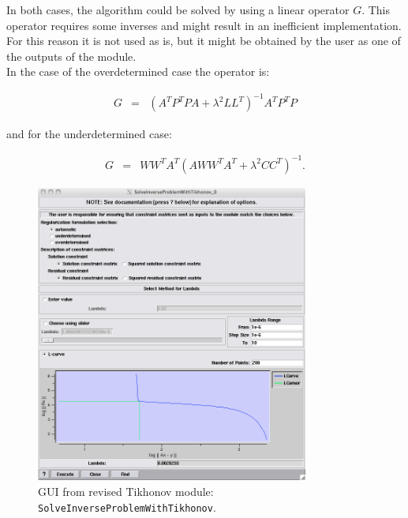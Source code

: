 \noindent In both cases, the algorithm could be solved by using a linear operator $G$. This operator requires some inverses and might result in an inefficient implementation. 
For this reason it is not used as is, but it might be obtained by the user as one of the outputs of the module.\\
In the case of the overdetermined case the operator is:
\begin{center}
\begin{eqnarray}
   G &=& (A^{T} P^{T} P A + \lambda^{2} L L^{T})^{-1} A^{T} P^{T} P
\label{tik_problem_overdet_invop}
\end{eqnarray}
\end{center}
\noindent and for the underdetermined case:
\begin{center}
\begin{eqnarray}
   G &=& W W ^{T} A^{T} (A W W^{T} A^{T} + \lambda^{2} C C^{T})^{-1} .
\label{tik_problem_underdet_invop}
\end{eqnarray}
\end{center}


\begin{figure}[H]
\begin{center}
\includegraphics[width=0.8\textwidth]{ECGToolkitGuide_figures/tik2.png}
\caption{GUI from revised Tikhonov module: {\tt SolveInverseProblemWithTikhonov}.}
\label{tik_module_gui}
\end{center}
\end{figure}

